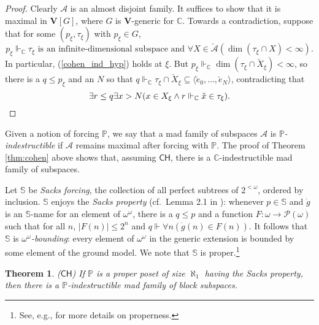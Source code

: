 \documentclass[11pt]{amsart}
\newcommand{\forces}{\mathrel{\Vdash}}
\newcommand{\C}{\mathbb{C}}
\renewcommand{\P}{\mathbb{P}}
\newcommand{\LP}{\mathcal{P}}
\newcommand{\LA}{\mathcal{A}}
\newtheorem{thm}{Theorem}[section]
\theoremstyle{definition}
\theoremstyle{remark}
\newcommand{\CH}{\mathsf{CH}}
\renewcommand{\P}{\mathbb{P}}
\renewcommand{\1}{\mathbf{1}}
\newcommand{\V}{\mathbf{V}}
\begin{document}
\begin{proof}
	Clearly $\LA$ is an almost disjoint family. It suffices to show that it is maximal in $\V[G]$, where $G$ is $\V$-generic for $\C$. Towards a contradiction, suppose that for some $(p_\xi,\tau_\xi)$ with $p_\xi\in G$,
	\[
	 	p_\xi\forces_\C\text{$\tau_\xi$ is an infinite-dimensional subspace and $\forall X\in\check{\LA}(\dim(\tau_\xi\cap X)<\infty)$}.
	\]
	In particular, (\ref{cohen_ind_hyp}) holds at $\xi$. But $p_\xi\forces_\C\dim(\tau_\xi\cap \check{X}_\xi)<\infty$, so there is a $q\leq p_\xi$ and an $N$ so that $q\forces_\C\tau_\xi\cap \check{X}_\xi\subseteq\langle \check{e}_0,\ldots,\check{e}_N\rangle$, contradicting that
	\[
		\exists r\leq q\exists x>N(x\in X_\xi \land r\forces_\C \check{x}\in\tau_\xi).\qedhere
	\]
\end{proof}

Given a notion of forcing $\P$, we say that a mad family of subspaces $\LA$ is \emph{$\P$-indestructible} if $\LA$ remains maximal after forcing with $\P$. The proof of Theorem \ref{thm:cohen} above shows that, assuming $\CH$, there is a $\C$-indestructible mad family of subspaces.

Let $\mathbb{S}$ be \emph{Sacks forcing}, the collection of all perfect subtrees of $2^{<\omega}$, ordered by inclusion. $\mathbb{S}$ enjoys the \emph{Sacks property} (cf.~Lemma 2.1 in \cite{MR556894}): whenever $p\in\mathbb{S}$ and $\dot{g}$ is an $\mathbb{S}$-name for an element of $\omega^\omega$, there is a $q\leq p$ and a function $F:\omega\to\LP(\omega)$ such that for all $n$, $|F(n)|\leq 2^n$ and $q\forces\forall n(\dot{g}(n)\in F(n))$. It follows that $\mathbb{S}$ is \emph{$\omega^\omega$-bounding}: every element of $\omega^\omega$ in the generic extension is bounded by some element of the ground model. We note that $\mathbb{S}$ is proper.\footnote{See, e.g., \cite{MooreYST} for more details on properness.}

\begin{thm}\label{thm:sacks_indes}
	\textup{($\CH$)} If $\P$ is a proper poset of size $\aleph_1$ having the Sacks property, then there is a $\P$-indestructible mad family of block subspaces.
\end{thm}
\end{document}

